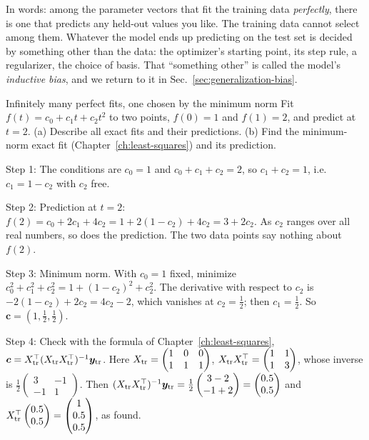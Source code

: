 In words: among the parameter vectors that fit the training data \emph{perfectly}, there is one that predicts any held-out values you like. The training data cannot select among them. Whatever the model ends up predicting on the test set is decided by something other than the data: the optimizer's starting point, its step rule, a regularizer, the choice of basis. That ``something other'' is called the model's \emph{inductive bias}, and we return to it in Sec.~\ref{sec:generalization-bias}.

\begin{sample}{Infinitely many perfect fits, one chosen by the minimum norm}
Fit $f(t)=c_0+c_1t+c_2t^2$ to two points, $f(0)=1$ and $f(1)=2$, and predict at $t=2$. (a) Describe all exact fits and their predictions. (b) Find the minimum-norm exact fit (Chapter~\ref{ch:least-squares}) and its prediction.

Step 1: The conditions are $c_0=1$ and $c_0+c_1+c_2=2$, so $c_1+c_2=1$, i.e.\ $c_1=1-c_2$ with $c_2$ free.

Step 2: Prediction at $t=2$: $f(2)=c_0+2c_1+4c_2=1+2(1-c_2)+4c_2=3+2c_2$. As $c_2$ ranges over all real numbers, so does the prediction. The two data points say nothing about $f(2)$.

Step 3: Minimum norm. With $c_0=1$ fixed, minimize $c_0^2+c_1^2+c_2^2=1+(1-c_2)^2+c_2^2$. The derivative with respect to $c_2$ is $-2(1-c_2)+2c_2=4c_2-2$, which vanishes at $c_2=\tfrac12$; then $c_1=\tfrac12$. So $\bm c=(1,\tfrac12,\tfrac12)$.

Step 4: Check with the formula of Chapter~\ref{ch:least-squares}, $\bm c=X_{\rm tr}^\top(X_{\rm tr}X_{\rm tr}^\top)^{-1}\bm y_{\rm tr}$. Here $X_{\rm tr}=\begin{pmatrix}1&0&0\\1&1&1\end{pmatrix}$, $X_{\rm tr}X_{\rm tr}^\top=\begin{pmatrix}1&1\\1&3\end{pmatrix}$, whose inverse is $\frac12\begin{pmatrix}3&-1\\-1&1\end{pmatrix}$. Then $(X_{\rm tr}X_{\rm tr}^\top)^{-1}\bm y_{\rm tr}=\frac12\begin{pmatrix}3-2\\-1+2\end{pmatrix}=\begin{pmatrix}0.5\\0.5\end{pmatrix}$ and $X_{\rm tr}^\top\begin{pmatrix}0.5\\0.5\end{pmatrix}=\begin{pmatrix}1\\0.5\\0.5\end{pmatrix}$, as found.


\end{sample}
